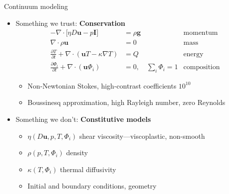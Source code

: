 \documentclass[aspectratio=169]{beamer}
\begin{document}
\begin{frame}{Continuum modeling}
  \begin{itemize}
  \item Something we trust: \textbf{Conservation}
    \begin{align*}
      -\nabla\cdot \big[ \eta D \bm u - p \bm I \big] &= \rho \bm g & \text{momentum} \\
      \nabla \cdot \rho \bm u &= 0 & \text{mass} \\
      \frac{\partial T}{\partial t} + \nabla\cdot (\bm u T - \kappa \nabla T) &= Q & \text{energy} \\
      \frac{\partial \Phi_i}{\partial t} + \nabla\cdot (\bm u \Phi_i) &= 0, \quad \sum_i\Phi_i=1 & \text{composition}
    \end{align*}
    \begin{itemize}
    \item Non-Newtonian Stokes, high-contrast coefficients $10^{10}$
    \item Boussinesq approximation, high Rayleigh number, zero Reynolds
    \end{itemize}
  \item Something we don't: \textbf{Constitutive models}
    \begin{itemize}
    \item $\eta(D\bm u,p,T,\Phi_i)$ shear viscosity---viscoplastic, non-smooth
    \item $\rho(p,T,\Phi_i)$ density
    \item $\kappa(T, \Phi_i)$ thermal diffusivity
    \item Initial and boundary conditions, geometry
    \end{itemize}
  \end{itemize}
\end{frame}
\end{document}
